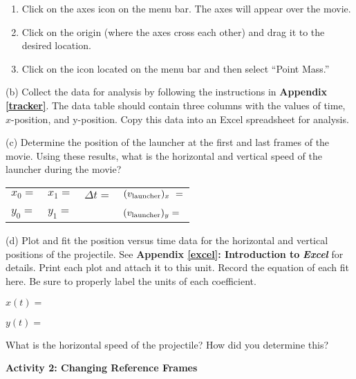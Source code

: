 \begin{enumerate}
\item Click on the axes icon on the menu bar.
The axes will appear over the movie. 

\item Click on the origin (where the axes cross each other) and drag it to
the desired location.

\item Click on the  icon located on the menu bar and then select ``Point Mass.''
\end{enumerate}

(b) Collect the data for analysis by following the instructions in
\textbf{Appendix \ref{tracker}}. The data table should contain three columns with
the values of time, $x$-position, and y-position. Copy this data into an Excel spreadsheet for analysis.

(c) Determine the position of the launcher at the first and last frames
of the movie. Using these results, what is the horizontal and vertical
speed of the launcher during the movie?

\vspace{0.3cm}
{\centering \begin{tabular}{p{20mm}p{20mm}p{30mm}p{70mm}}
\( x_{0}= \) &
\( x_{1}= \)&
\( \Delta t= \)&
\( (v_{\rm launcher})_{x}\ = \) \\
&
&
&
\\
\( y_{0}= \)&
\( y_{1}= \) &
&
\( (v_{\rm launcher})_{y} =\) \\
\end{tabular}\par}
\vspace{0.3cm}

(d) Plot and fit the position versus time data for the horizontal
and vertical positions of the projectile. See \textbf{Appendix \ref{excel}:
Introduction to} \textbf{\emph{Excel}} for details. Print each
plot and attach it to this unit. Record the equation of each fit here.
Be sure to properly label the units of each coefficient.

$x(t) =$
\vspace*{5mm}

$y(t) =$
\vspace{5mm}

What is the horizontal speed of the projectile? How did you determine
this?
\vspace{2in}

\textbf{Activity 2: Changing Reference Frames}

